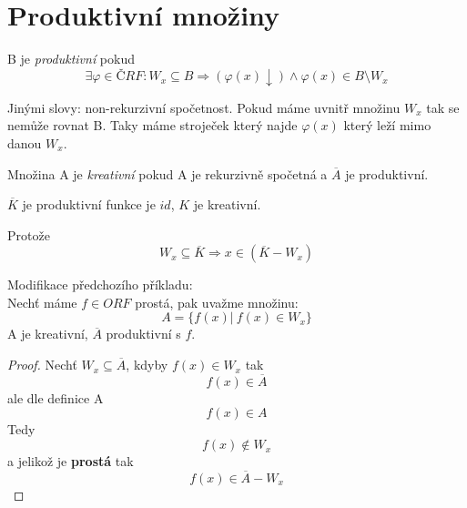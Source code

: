 \section{\texorpdfstring{Produktivní množiny}{Produktivní množiny}}
\vspace{5mm}
\large

\begin{definition}
	B je \emph{produktivní} pokud
	\[ \exists \varphi \in ČRF: W_x \subseteq B \Rightarrow (\varphi(x) \downarrow) \land \varphi(x) \in B \setminus W_x \]

	Jinými slovy: non-rekurzivní spočetnost. Pokud máme uvnitř množinu $W_x$ tak se nemůže rovnat B.
	Taky máme stroječek který najde $\varphi(x)$ který leží mimo danou $W_x$.
\end{definition}

\begin{definition}
	Množina A je \emph{kreativní} pokud A je rekurzivně spočetná a $\overline{A}$ je produktivní.
\end{definition}

\begin{example}
	$\overline{K}$ je produktivní funkce je $id$, $K$ je kreativní.

	Protože
	\[ W_x \subseteq \overline{K} \Rightarrow x \in (\overline{K} - W_x) \]
\end{example}

\begin{theorem}[Modifikace K]
	Modifikace předchozího příkladu:\\
	Nechť máme $f \in ORF$ prostá, pak uvažme množinu:
	\[ A = \{ f(x)| \ f(x) \in W_x \} \]
	A je kreativní, $\overline{A}$ produktivní s $f$.
\end{theorem}
\begin{proof}
	Nechť $W_x \subseteq \overline{A}$, kdyby $f(x) \in W_x$ tak
	\[ f(x) \in \overline{A} \]
	ale dle definice A
	\[ f(x) \in A \]
	Tedy
	\[ f(x) \notin W_x \]
	a jelikož je \textbf{prostá} tak
	\[ f(x) \in \overline{A} - W_x \]
\end{proof}

